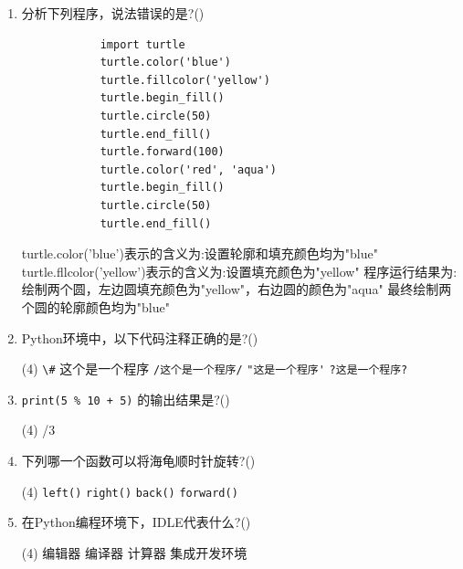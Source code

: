 \documentclass[11pt]{ctexart}
\begin{document}
\begin{enumerate}
        \newpage
        \item 分析下列程序，说法错误的是?(\qquad)
        \begin{lstlisting}
            import turtle
            turtle.color('blue')
            turtle.fillcolor('yellow')
            turtle.begin_fill()
            turtle.circle(50)
            turtle.end_fill()
            turtle.forward(100)
            turtle.color('red', 'aqua')
            turtle.begin_fill()
            turtle.circle(50)
            turtle.end_fill()
        \end{lstlisting}
        \begin{tasks}
            \task turtle.color('blue')表示的含义为:设置轮廓和填充颜色均为"blue"
            \task turtle.fllcolor('yellow')表示的含义为:设置填充颜色为"yellow"
            \task 程序运行结果为:绘制两个圆，左边圆填充颜色为"yellow"，右边圆的颜色为"aqua"
            \task 最终绘制两个圆的轮廓颜色均为"blue"
        \end{tasks}

        \item Python环境中，以下代码注释正确的是?(\qquad)
        \begin{tasks}(4)
            \task \lstinline!\#! 这个是一个程序
            \task \lstinline!/这个是一个程序/!
            \task \lstinline!"这是一个程序'!
            \task \lstinline!?这是一个程序?!
        \end{tasks}

        \item \lstinline!print(5 % 10 + 5)! 的输出结果是?(\qquad)
        \begin{tasks}(4)
            /3
        \end{tasks}

        \item 下列哪一个函数可以将海龟顺时针旋转?(\qquad)
        \begin{tasks}(4)
            \task \lstinline{left()}
            \task \lstinline{right()}
            \task \lstinline{back()}
            \task \lstinline{forward()}
        \end{tasks}

        \item 在Python编程环境下，IDLE代表什么?(\qquad)
        \begin{tasks}(4)
            \task 编辑器
            \task 编译器
            \task 计算器
            \task 集成开发环境
        \end{tasks}


\end{enumerate}
\end{document}
